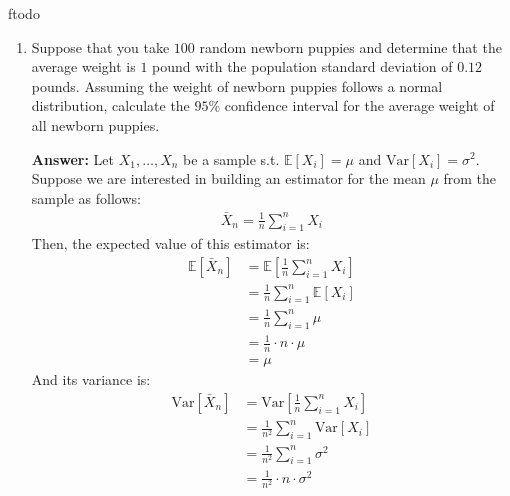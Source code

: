 ƒtodo\documentclass{article}
\newenvironment{QandA}{\begin{enumerate}[label=\arabic*.]}{\end{enumerate}}
\newenvironment{answer}{\par\normalfont \textbf{Answer:}}{}
\newcommand{\Exp}[1]{\mathbb{E}\left[ #1 \right]}
\newcommand{\Vari}[1]{\text{Var}\left[ #1 \right]}
\begin{document}
\begin{QandA}
\begin{answer}
        (Source: \href{https://stats.stackexchange.com/questions/12842/covariance-and-independence}{StackExchange})\\\\
        Quick proof for $\Exp{X^3} = 0$: Since $X \sim N(0, \sigma^2)$, this means that the expectation is symmetric wrt X. Then:
        \begin{align*}
            \Exp{X^3} &= \Exp{(-X)^3} = \Exp{-X^3} = - \Exp{X^3} \\
            \implies \Exp{X^3} &= 0
        \end{align*}
        
    \end{answer}

    \item Suppose that you take $100$ random newborn puppies and determine that the average weight is $1$ pound with the population standard deviation of $0.12$ pounds. Assuming the weight of newborn puppies follows a normal distribution, calculate the $95\%$ confidence interval for the average weight of all newborn puppies.
    \begin{answer}
        Let $X_1, \ldots, X_n$ be a sample s.t. $\Exp{X_i} = \mu$ and $\Vari{X_i} = \sigma^2$. Suppose we are interested in building an estimator for the mean $\mu$ from the sample as follows:
        \begin{align*}
            \bar{X}_n = \frac{1}{n} \sum_{i=1}^n X_i
        \end{align*}
        Then, the expected value of this estimator is:
        \begin{align*}
            \Exp{\bar{X}_n} &= \Exp{\frac{1}{n} \sum_{i=1}^n X_i} \\
            &= \frac{1}{n} \sum_{i=1}^n \Exp{X_i} \\
            &= \frac{1}{n} \sum_{i=1}^n \mu \\
            &= \frac{1}{n} \cdot n \cdot \mu \\
            &= \mu
        \end{align*}
        And its variance is:
        \begin{align*}
            \Vari{\bar{X}_n} &= \Vari{\frac{1}{n} \sum_{i=1}^n X_i} \\
            &= \frac{1}{n^2} \sum_{i=1}^n \Vari{X_i} \\
            &= \frac{1}{n^2} \sum_{i=1}^n \sigma^2 \\
            &= \frac{1}{n^2} \cdot n \cdot \sigma^2 \\

\end{align*}
\end{answer}
\end{QandA}
\end{document}
